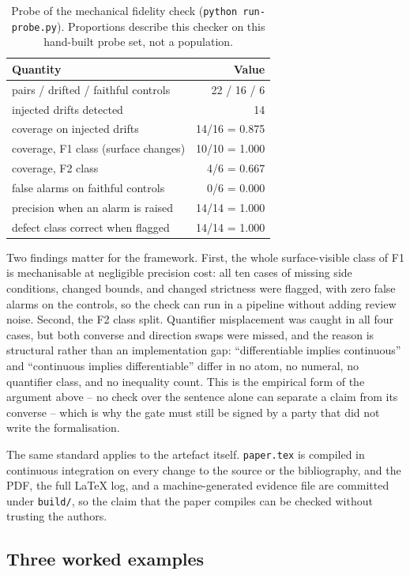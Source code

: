 \documentclass[11pt]{article}
\theoremstyle{plain}
\theoremstyle{definition}
\begin{document}
\begin{table}[t]
\centering
\small
\caption{Probe of the mechanical fidelity check (\texttt{python run-probe.py}). Proportions
describe this checker on this hand-built probe set, not a population.}
\label{tab:probe}
\begin{tabular}{@{}lr@{}}
\toprule
Quantity & Value \\
\midrule
pairs / drifted / faithful controls & 22 / 16 / 6 \\
injected drifts detected & 14 \\
coverage on injected drifts & 14/16 = 0.875 \\
coverage, F1 class (surface changes) & 10/10 = 1.000 \\
coverage, F2 class & 4/6 = 0.667 \\
false alarms on faithful controls & 0/6 = 0.000 \\
precision when an alarm is raised & 14/14 = 1.000 \\
defect class correct when flagged & 14/14 = 1.000 \\
\bottomrule
\end{tabular}
\end{table}

Two findings matter for the framework. First, the whole surface-visible class of F1 is
mechanisable at negligible precision cost: all ten cases of missing side conditions, changed
bounds, and changed strictness were flagged, with zero false alarms on the controls, so the check
can run in a pipeline without adding review noise. Second, the F2 class split. Quantifier
misplacement was caught in all four cases, but both converse and direction swaps were missed, and
the reason is structural rather than an implementation gap: ``differentiable implies continuous''
and ``continuous implies differentiable'' differ in no atom, no numeral, no quantifier class, and
no inequality count. This is the empirical form of the argument above -- no check over the sentence
alone can separate a claim from its converse -- which is why the gate must still be signed by a
party that did not write the formalisation.

The same standard applies to the artefact itself. \texttt{paper.tex} is compiled in continuous
integration on every change to the source or the bibliography, and the PDF, the full \LaTeX{} log,
and a machine-generated evidence file are committed under \texttt{build/}, so the claim that the
paper compiles can be checked without trusting the authors.

\subsection{Three worked examples}
\end{document}
